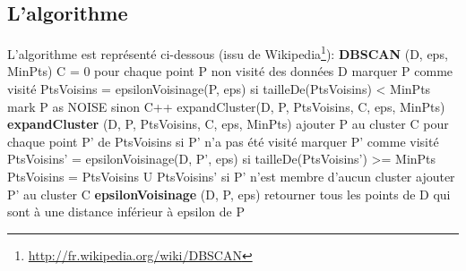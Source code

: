 \documentclass{report}
\begin{document}
\subsection{L'algorithme}

L'algorithme est représenté ci-dessous (issu de Wikipedia\footnote{\url{http://fr.wikipedia.org/wiki/DBSCAN}}):
\newline
\newline
\textbf{DBSCAN} (D, eps, MinPts)
\newline
\indent C = 0
\newline
\indent pour chaque point P non visité des données D
\newline
\indent \indent marquer P comme visité
\newline
\indent \indent PtsVoisins = epsilonVoisinage(P, eps)
\newline
\indent \indent si tailleDe(PtsVoisins) < MinPts
\newline
\indent \indent \indent mark P as NOISE
\newline
\indent \indent sinon
\newline
\indent \indent \indent C++
\newline
\indent \indent \indent expandCluster(D, P, PtsVoisins, C, eps, MinPts)
\newline
\newline          
\textbf{expandCluster} (D, P, PtsVoisins, C, eps, MinPts)
\newline
\indent ajouter P au cluster C
\newline
\indent pour chaque point P' de PtsVoisins
\newline
\indent \indent si P' n'a pas été visité
\newline
\indent \indent marquer P' comme visité
\newline
\indent \indent PtsVoisins' = epsilonVoisinage(D, P', eps)
\newline
\indent \indent si tailleDe(PtsVoisins') >= MinPts
\newline
\indent \indent \indent PtsVoisins = PtsVoisins U PtsVoisins'
\newline
\indent \indent si P' n'est membre d'aucun cluster
\newline
\indent \indent \indent ajouter P' au cluster C
\newline
\newline
\textbf{epsilonVoisinage} (D, P, eps)
\newline
\indent retourner tous les points de D qui sont à une distance inférieur à epsilon de P
\end{document}
